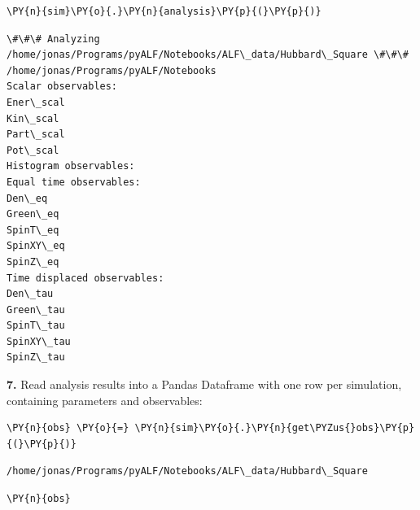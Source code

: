     \begin{tcolorbox}[breakable, size=fbox, boxrule=1pt, pad at break*=1mm,colback=cellbackground, colframe=cellborder]
\begin{Verbatim}[commandchars=\\\{\}]
\PY{n}{sim}\PY{o}{.}\PY{n}{analysis}\PY{p}{(}\PY{p}{)}
\end{Verbatim}
\end{tcolorbox}

    \begin{Verbatim}[commandchars=\\\{\}]
\#\#\# Analyzing /home/jonas/Programs/pyALF/Notebooks/ALF\_data/Hubbard\_Square \#\#\#
/home/jonas/Programs/pyALF/Notebooks
Scalar observables:
Ener\_scal
Kin\_scal
Part\_scal
Pot\_scal
Histogram observables:
Equal time observables:
Den\_eq
Green\_eq
SpinT\_eq
SpinXY\_eq
SpinZ\_eq
Time displaced observables:
Den\_tau
Green\_tau
SpinT\_tau
SpinXY\_tau
SpinZ\_tau
    \end{Verbatim}

    \textbf{7.} Read analysis results into a Pandas Dataframe with one row
per simulation, containing parameters and observables:

    \begin{tcolorbox}[breakable, size=fbox, boxrule=1pt, pad at break*=1mm,colback=cellbackground, colframe=cellborder]
\begin{Verbatim}[commandchars=\\\{\}]
\PY{n}{obs} \PY{o}{=} \PY{n}{sim}\PY{o}{.}\PY{n}{get\PYZus{}obs}\PY{p}{(}\PY{p}{)}
\end{Verbatim}
\end{tcolorbox}

    \begin{Verbatim}[commandchars=\\\{\}]
/home/jonas/Programs/pyALF/Notebooks/ALF\_data/Hubbard\_Square
    \end{Verbatim}

    \begin{tcolorbox}[breakable, size=fbox, boxrule=1pt, pad at break*=1mm,colback=cellbackground, colframe=cellborder]
\begin{Verbatim}[commandchars=\\\{\}]
\PY{n}{obs}
\end{Verbatim}
\end{tcolorbox}

